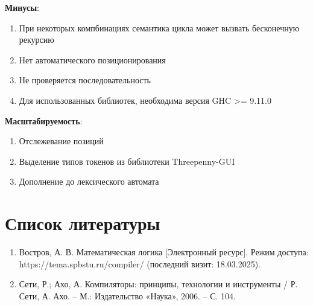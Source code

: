 \documentclass[areasetadvanced]{scrartcl}
\begin{document}
\textbf{Минусы}: 
\begin{enumerate}
    \item При некоторых компбинациях семантика цикла может вызвать бесконечную рекурсию
    \item Нет автоматического позиционирования 
    \item Не проверяется последовательность 
    \item Для использованных библиотек, необходима версия GHC >= 9.11.0
\end{enumerate}
\textbf{Масштабируемость}:
\begin{enumerate}
    \item Отслежевание позиций
    \item Выделение типов токенов из библиотеки Threepenny-GUI
    \item Дополнение до лексического автомата
\end{enumerate}
\newpage
\section*{Список литературы}
\begin{enumerate}
    \item \begin{sloppypar}Востров, А. В. Математическая логика [Электронный ресурс]. Режим доступа: https://tema.spbstu.ru/compiler/ (последний визит: 18.03.2025). \end{sloppypar}
    \item Сети, Р.; Ахо, А. Компиляторы: принципы, технологии и инструменты / Р. Сети, А. Ахо. – М.: Издательство «Наука», 2006. – С. 104.
\end{enumerate}
\end{document}
